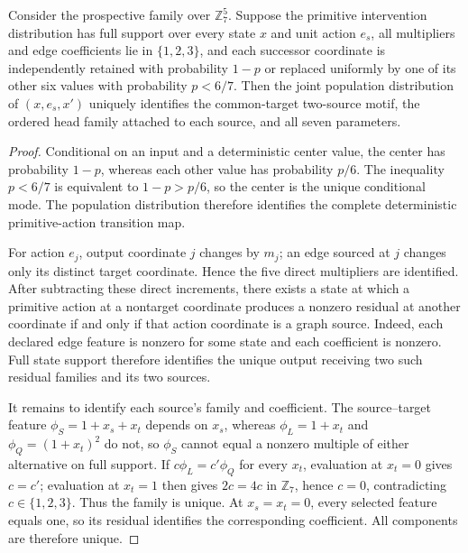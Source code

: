 \begin{proposition}
\label{prop:motif-identifiability}
Consider the prospective family over \(\mathbb Z_7^5\).  Suppose the primitive
intervention distribution has full support over every state \(x\) and unit
action \(e_s\), all multipliers and edge coefficients lie in
\(\{1,2,3\}\), and each successor coordinate is independently retained with
probability \(1-p\) or replaced uniformly by one of its other six values with
probability \(p<6/7\).  Then the joint population distribution of
\((x,e_s,x')\) uniquely identifies the common-target two-source motif, the
ordered head family attached to each source, and all seven parameters.
\end{proposition}
\begin{proof}
Conditional on an input and a deterministic center value, the center has
probability \(1-p\), whereas each other value has probability \(p/6\).
The inequality \(p<6/7\) is equivalent to \(1-p>p/6\), so the center is the
unique conditional mode.  The population distribution therefore identifies
the complete deterministic primitive-action transition map.

For action \(e_j\), output coordinate \(j\) changes by \(m_j\); an edge sourced
at \(j\) changes only its distinct target coordinate.  Hence the five direct
multipliers are identified.  After subtracting these direct increments,
there exists a state at which a primitive action at a nontarget coordinate
produces a nonzero residual at another coordinate if and only if that action
coordinate is a graph source.  Indeed, each declared edge feature is nonzero
for some state and each coefficient is nonzero.  Full state support therefore
identifies the unique output receiving two such residual families and its two
sources.

It remains to identify each source's family and coefficient.  The
source--target feature
\(\phi_S=1+x_s+x_t\) depends on \(x_s\), whereas
\(\phi_L=1+x_t\) and \(\phi_Q=(1+x_t)^2\) do not, so \(\phi_S\) cannot equal a
nonzero multiple of either alternative on full support.  If
\(c\phi_L=c'\phi_Q\) for every \(x_t\), evaluation at \(x_t=0\) gives \(c=c'\);
evaluation at \(x_t=1\) then gives \(2c=4c\) in \(\mathbb Z_7\), hence
\(c=0\), contradicting \(c\in\{1,2,3\}\).  Thus the family is unique.  At
\(x_s=x_t=0\), every selected feature equals one, so its residual identifies
the corresponding coefficient.  All components are therefore unique.
\end{proof}

